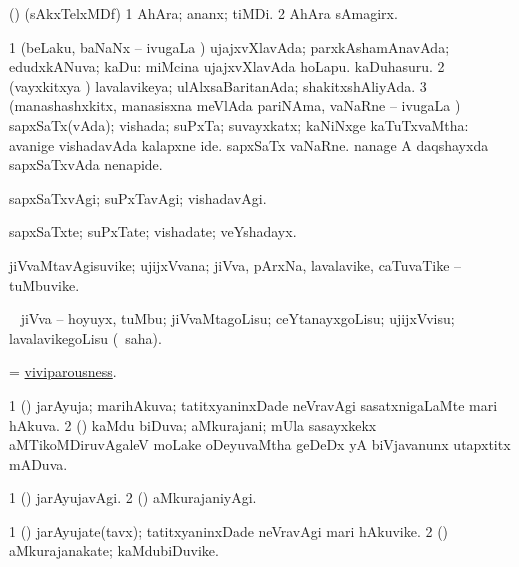 \bentry
{} 
\gl{\nA}
\expl{}
\bmng
 (\bava) (sAkxTelxMDf) 
\bnum
\num{1} AhAra; ananx; tiMDi. 
\num{2} AhAra sAmagirx. 
\enum
\emng
\eentry

\bentry 
{} 
\gl{\gu}
\expl{}
\bmng
\bnum
\num{1} (beLaku, baNaNx -- ivugaLa \vi) ujajxvXlavAda; parxkAshamAnavAda; edudxkANuva; kaDu:  miMcina ujajxvXlavAda hoLapu.  kaDuhasuru. 
\num{2} (vayxkitxya \vi) lavalavikeya; ulAlxsaBaritanAda; shakitxshAliyAda. 
\num{3} (manashashxkitx, manasisxna meVlAda pariNAma, vaNaRne -- ivugaLa \vi) sapxSaTx(vAda); vishada; suPxTa; suvayxkatx; kaNiNxge kaTuTxvaMtha:  avanige vishadavAda kalapxne ide.  sapxSaTx vaNaRne.  nanage A daqshayxda sapxSaTxvAda nenapide. 
\enum
\emng
\eentry

\bentry 
{} 
\gl{\kirxvi}
\expl{}
\bmng
 sapxSaTxvAgi; suPxTavAgi; vishadavAgi. 
\emng
\eentry

\bentry 
{} 
\gl{\nA}
\expl{}
\bmng
 sapxSaTxte; suPxTate; vishadate; veYshadayx. 
\emng
\eentry

\bentry
{} 
\gl{\nA}
\expl{}
\bmng
 jiVvaMtavAgisuvike; ujijxVvana; jiVva, pArxNa, lavalavike, caTuvaTike -- tuMbuvike. 
\emng
\eentry

\bentry
{} 
\gl{\akirx}
\BUkaq\  \bmng
 jiVva -- hoyuyx, tuMbu; jiVvaMtagoLisu; ceYtanayxgoLisu; ujijxVvisu; lavalavikegoLisu (\rUpa\ saha). 
\emng
\eentry

\bentry 
{} 
\gl{\nA}
\expl{}
\bmng
 = \hyperlink{viviparousness}{viviparousness}. 
\emng
\eentry

\bentry 
{} 
\gl{\gu}
\expl{}
\bmng
\bnum
\num{1} (\pArxvi) jarAyuja; marihAkuva; tatitxyaninxDade neVravAgi sasatxnigaLaMte mari hAkuva. 
\num{2} (\savi) kaMdu biDuva; aMkurajani; mUla sasayxkekx aMTikoMDiruvAgaleV moLake oDeyuvaMtha geDeDx yA biVjavanunx utapxtitx mADuva. 
\enum
\emng
\eentry

\bentry 
{} 
\gl{\kirxvi}
\expl{}
\bmng
\bnum
\num{1} (\pArxvi) jarAyujavAgi. 
\num{2} (\savi) aMkurajaniyAgi. 
\enum
\emng
\eentry

\bentry
{} 
\gl{\nA}
\expl{}
\bmng
\bnum
\num{1} (\pArxvi) jarAyujate(tavx); tatitxyaninxDade neVravAgi mari hAkuvike. 
\num{2} (\savi) aMkurajanakate; kaMdubiDuvike. 
\enum
\emng
\eentry

